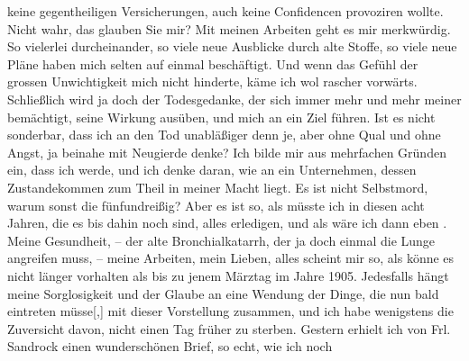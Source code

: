 \begin{ledgroupsized}[t]{13cm}
               keine gegentheiligen Versicherungen, auch keine Confidencen provoziren wollte. Nicht
               wahr, das glauben Sie mir?\pend
           \pstart
           {\pb}Mit meinen Arbeiten geht es
               mir merkwürdig. So vielerlei durcheinander, so viele neue Ausblicke durch alte
               Stoffe, so viele neue Pläne haben mich selten auf einmal beschäftigt. Und wenn das
               Gefühl der grossen Unwichtigkeit mich nicht hinderte, käme ich wol rascher vorwärts.
               Schließlich wird ja doch der Todesgedanke, der sich immer mehr und mehr meiner
               bemächtigt, seine Wirkung ausüben, und mich an ein Ziel führen. Ist es nicht
               sonderbar, dass ich an den Tod unabläßiger denn je, aber ohne Qual und ohne Angst, ja
               beinahe mit Neugierde denke? Ich bilde mir aus mehrfachen Gründen ein, dass ich
                  \label{K_L03266-4v}\label{K_L03266-4h} werde, und ich denke daran, wie an
               ein Unternehmen, dessen Zustandekommen zum Theil in meiner Macht liegt. Es ist nicht
               Selbstmord, warum sonst die fünfundreißig? Aber es ist so, als müsste ich in diesen
                  {\pb}acht Jahren, die es bis
               dahin noch sind, alles erledigen, und als wäre ich dann eben \label{K_L03266-5v}\label{K_L03266-5h}. Meine Gesundheit, – der alte Bronchialkatarrh, der ja doch einmal
               die Lunge angreifen muss, – meine Arbeiten, mein Lieben, alles scheint mir so, als
               könne es nicht länger vorhalten als bis zu jenem Märztag im Jahre 1905. Jedesfalls hängt meine Sorglosigkeit und der Glaube an eine Wendung
               der Dinge, die nun bald eintreten müsse{[},{]} mit dieser Vorstellung
               zusammen, und ich habe wenigstens die Zuversicht davon, nicht einen Tag früher zu
               sterben.\pend
           \pstart
           Gestern erhielt ich von Frl. Sandrock einen wunderschönen Brief, so echt, wie ich noch

\end{ledgroupsized}
